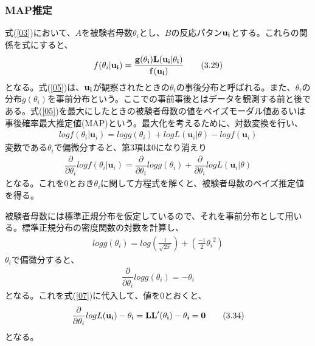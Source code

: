 \documentclass[12pt]{jarticle}
\begin{document}
\subsubsection{MAP推定}
式(\ref{03})において、$A$を被験者母数$\theta_i$とし、$B$の反応パタン$\displaystyle \bf u_i$とする。これらの関係を式にすると、
\begin{align}
  \label{05}
  \displaystyle f(\theta_i|\bf{u_i}) = \frac{g(\theta_i)L(\bf{u_i}|\theta_i)}{f(\bf{u_i})} \tag{3.29}
\end{align}
となる。式(\ref{05})は、$\bf{u_i}$が観察されたときの$\theta_i$の事後分布と呼ばれる。また、$\theta_i$の分布$g(\theta_i)$を事前分布という。ここでの事前事後とはデータを観測する前と後である。式(\ref{05})を最大にしたときの被験者母数の値をベイズモーダル値あるいは事後確率最大推定値(MAP)という。最大化を考えるために、対数変換を行い、
\begin{align}
  \label{06}
  \displaystyle log f(\theta_i|\boldsymbol u_i) = log g(\theta_i) + log L(\boldsymbol u_i|\theta) - log f(\boldsymbol u_i) \tag{3.30}
\end{align}
変数である$\theta_i$で偏微分すると、第$3$項は$0$になり消えり
\begin{align}
  \label{07}
  \displaystyle \dfrac{\partial }{\partial \theta_i} log f(\theta_i|\boldsymbol u_i) = \dfrac{\partial }{\partial \theta_i} log g(\theta_i) + \dfrac{\partial }{\partial \theta_i} log L(\boldsymbol u_i|\theta)  \tag{3.31}
\end{align}
となる。これを$0$とおき$\theta_i$に関して方程式を解くと、被験者母数のベイズ推定値を得る。

被験者母数には標準正規分布を仮定しているので、それを事前分布として用いる。標準正規分布の密度関数の対数を計算し、
\begin{align}
  \label{08}
  \displaystyle log g(\theta_i) = log \left(\frac{1}{\sqrt{2\pi}}\right) + \left(\frac{-1}{2} {\theta_i}^2\right)  \tag{3.32}
\end{align}
$\theta_i$で偏微分すると、
\begin{align}
  \label{09}
  \displaystyle   \dfrac{\partial }{\partial \theta_i} log g(\theta_i) = -\theta_i \tag{3.33}
\end{align}
となる。これを式(\ref{07})に代入して、値を$0$とおくと、
\begin{align}
  \label{10}
  \displaystyle  \dfrac{\partial }{\partial \theta_i}log L(\bf u_i) - \theta_i  = LL^{\prime}(\theta_i) - \theta_i = 0 \tag{3.34}
\end{align}
となる。
\end{document}
